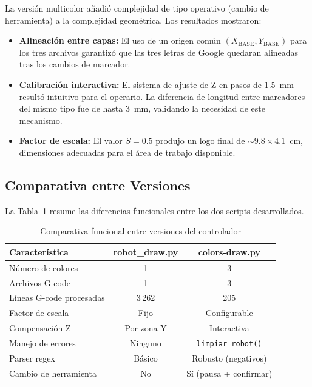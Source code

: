 \documentclass[journal,compsoc]{IEEEtran}
\begin{document}
La versión multicolor añadió complejidad de tipo operativo (cambio de herramienta) a la complejidad geométrica. Los resultados mostraron:

\begin{itemize}
    \item \textbf{Alineación entre capas:} El uso de un origen común $(X_{\text{BASE}}, Y_{\text{BASE}})$ para los tres archivos garantizó que las tres letras de Google quedaran alineadas tras los cambios de marcador.
    \item \textbf{Calibración interactiva:} El sistema de ajuste de Z en pasos de 1.5~mm resultó intuitivo para el operario. La diferencia de longitud entre marcadores del mismo tipo fue de hasta 3~mm, validando la necesidad de este mecanismo.
    \item \textbf{Factor de escala:} El valor $S = 0.5$ produjo un logo final de $\sim 9.8 \times 4.1$~cm, dimensiones adecuadas para el área de trabajo disponible.
\end{itemize}

\subsection{Comparativa entre Versiones}

La Tabla~\ref{tab:comparison} resume las diferencias funcionales entre los dos scripts desarrollados.

\begin{table}[h]
\renewcommand{\arraystretch}{1.3}
\caption{Comparativa funcional entre versiones del controlador}
\label{tab:comparison}
\centering
\begin{tabular}{lcc}
\toprule
\textbf{Característica} & \textbf{robot\_draw.py} & \textbf{colors-draw.py} \\
\midrule
Número de colores        & 1        & 3 \\
Archivos G-code          & 1        & 3 \\
Líneas G-code procesadas & 3\,262   & 205 \\
Factor de escala         & Fijo     & Configurable \\
Compensación Z           & Por zona Y & Interactiva \\
Manejo de errores        & Ninguno  & \texttt{limpiar\_robot()} \\
Parser regex             & Básico   & Robusto (negativos) \\
Cambio de herramienta    & No       & Sí (pausa + confirmar) \\
\bottomrule
\end{tabular}
\end{table}
\end{document}
